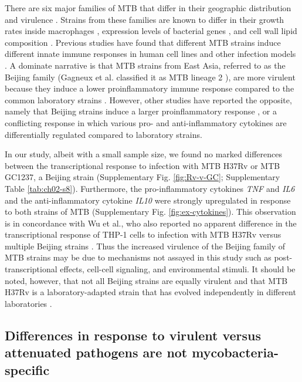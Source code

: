There are six major families of MTB that differ in their geographic
distribution and virulence \citep{Gagneux2006, Comas2009}. Strains from
these families are known to differ in their growth rates inside
macrophages \citep{Li2002}, expression levels of bacterial genes
\citep{Homolka2010, Rose2013}, and cell wall lipid composition
\citep{Krishnan2011}. Previous studies have found that different MTB
strains induce different innate immune responses in human cell lines and
other infection models \citep{Coscolla2010}. A dominate narrative is that
MTB strains from East Asia, referred to as the Beijing family (Gagneux
et al. classified it as MTB lineage 2 \citep{Gagneux2006}), are more
virulent because they induce a lower proinflammatory immune response
compared to the common laboratory strains \citep{Manca2001, Manca2004,
Reed2004, Tanveer2009, Wang2010}. However, other studies have
reported the opposite, namely that Beijing strains induce a larger
proinflammatory response \citep{Chacon-Salinas2005}, or a conflicting
response in which various pro- and anti-inflammatory cytokines are
differentially regulated \citep{Rocha-Ramirez2008, Koo2012} compared to
laboratory strains.

In our study, albeit with a small sample size, we found no marked
differences between the transcriptional response to infection with MTB
H37Rv or MTB GC1237, a Beijing strain (Supplementary Fig. \ref{fig:Rv-v-GC};
Supplementary Table \ref{tab:ch02-s8}). Furthermore, the pro-inflammatory cytokines
\emph{TNF} and \emph{IL6} and the anti-inflammatory cytokine \emph{IL10}
were strongly upregulated in response to both strains of MTB
(Supplementary Fig. \ref{fig:ex-cytokines}). This observation is in concordance with Wu et
al., who also reported no apparent difference in the transcriptional
response of THP-1 cells to infection with MTB H37Rv versus multiple
Beijing strains \citep{Wu2012}. Thus the increased virulence of the
Beijing family of MTB strains may be due to mechanisms not assayed in
this study such as post-transcriptional effects, cell-cell signaling,
and environmental stimuli. It should be noted, however, that not all
Beijing strains are equally virulent \citep{Dormans2004, Sinsimer2008}
and that MTB H37Rv is a laboratory-adapted strain that has evolved
independently in different laboratories \citep{Ioerger2010}.

\subsection{Differences in response to virulent versus attenuated
pathogens are not
mycobacteria-specific}\label{differences-in-response-to-virulent-versus-attenuated-pathogens-are-not-mycobacteria-specific}


